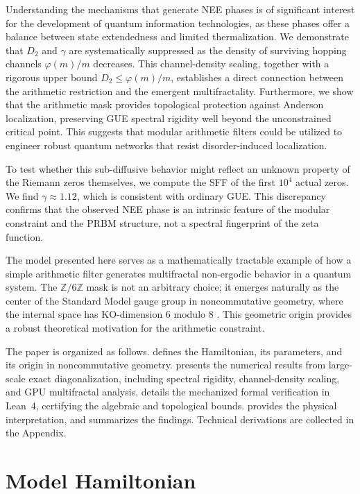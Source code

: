 \documentclass[11pt,a4paper]{article}
\begin{document}
Understanding the mechanisms that generate NEE phases is of significant interest for the development of quantum information technologies, as these phases offer a balance between state extendedness and limited thermalization. We demonstrate that $D_2$ and $\gamma$ are systematically suppressed as the density of surviving hopping channels $\varphi(m)/m$ decreases. This channel-density scaling, together with a rigorous upper bound $D_2 \le \varphi(m)/m$, establishes a direct connection between the arithmetic restriction and the emergent multifractality. Furthermore, we show that the arithmetic mask provides topological protection against Anderson localization, preserving GUE spectral rigidity well beyond the unconstrained critical point. This suggests that modular arithmetic filters could be utilized to engineer robust quantum networks that resist disorder-induced localization.

To test whether this sub-diffusive behavior might reflect an unknown property of the Riemann zeros themselves, we compute the SFF of the first $10^4$ actual zeros. We find $\gamma \approx 1.12$, which is consistent with ordinary GUE. This discrepancy confirms that the observed NEE phase is an intrinsic feature of the modular constraint and the PRBM structure, not a spectral fingerprint of the zeta function.

The model presented here serves as a mathematically tractable example of how a simple arithmetic filter generates multifractal non-ergodic behavior in a quantum system. The $\mathbb{Z}/6\mathbb{Z}$ mask is not an arbitrary choice; it emerges naturally as the center of the Standard Model gauge group in noncommutative geometry, where the internal space has KO-dimension 6 modulo 8 \cite{Connes2008,Chamseddine2007}. This geometric origin provides a robust theoretical motivation for the arithmetic constraint.

The paper is organized as follows.  defines the Hamiltonian, its parameters, and its origin in noncommutative geometry.  presents the numerical results from large-scale exact diagonalization, including spectral rigidity, channel-density scaling, and GPU multifractal analysis.  details the mechanized formal verification in Lean~4, certifying the algebraic and topological bounds.  provides the physical interpretation, and  summarizes the findings. Technical derivations are collected in the Appendix.

\section{Model Hamiltonian}
\label{sec:model}
\end{document}
